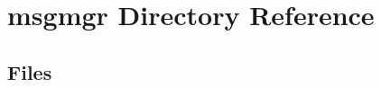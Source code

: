 \section{msgmgr Directory Reference}
\label{dir_ac0cecdf41b477760360ee16c0aa2458}
\subsection*{Files}
\begin{DoxyCompactItemize}
\end{DoxyCompactItemize}
